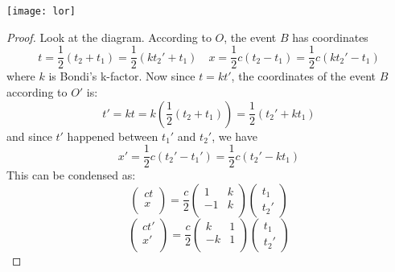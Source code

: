 \documentclass[12pt]{article}
\theoremstyle{defn}
\theoremstyle{pf}
\newcommand{\0}{\emptyset}
\renewcommand{\-}{\setminus}
\begin{document}
\begin{center}\texttt{[image: lor]}\end{center}

\begin{proof}Look at the diagram. According to $O$, the event $B$ has coordinates $$t=\dfrac{1}{2}(t_2+t_1)=\dfrac{1}{2}(kt_2'+t_1) \quad x=\dfrac{1}{2}c(t_2-t_1)=\dfrac{1}{2}c(kt_2'-t_1)$$ where $k$ is Bondi's k-factor. Now since $t=kt'$, the coordinates of the event $B$ according to $O'$ is: $$t'=kt=k\left(\dfrac{1}{2}(t_2+t_1)\right)=\dfrac{1}{2}(t_2'+kt_1)$$ and since $t'$ happened between $t_1'$ and $t_2'$, we have $$x'=\dfrac{1}{2}c(t_2'-t_1')=\dfrac{1}{2}c(t_2'-kt_1)$$ This can be condensed as: $$
\left(\begin{array}{c}
 ct\\
x\\
\end{array}\right)=
\dfrac{c}{2}\left(\begin{array}{cc}
             1 & k\\
-1 & k\\
            \end{array}\right)
\left(\begin{array}{c}
 t_1\\
t_2'
\end{array}\right)
$$
$$
\left(\begin{array}{c}
 ct'\\
x'\\
\end{array}\right)=
\dfrac{c}{2}\left(\begin{array}{cc}
             k & 1\\
-k & 1\\
            \end{array}\right)
\left(\begin{array}{c}
 t_1\\
t_2'
\end{array}\right)
$$


\end{proof}
\end{document}
